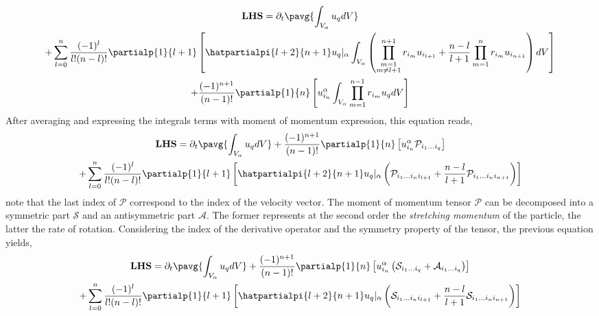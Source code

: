 {%
\begin{multline*}
    \textbf{LHS}
    = \partial_t \pavg{\int_{V_\alpha} u_q dV}\\
    + 
    \sum_{l=0}^n
    \frac{(-1)^l}{l!(n-l)!} \partialp{1}{l+1}
    \left[
    \hatpartialpi{l+2}{n+1} u_q|_\alpha
    \int_{V_\alpha} 
    \left(
        \prod_{\substack{m=1 \\ m \neq l+1}}^{n+1} r_{i_m}
        u_{i_{l+1}} 
        +\frac{n-l}{l+1}  
        \prod_{m=1}^{n}
        r_{i_m} u_{i_{n+1}}
    \right) dV
    \right]\\
    + \frac{(-1)^{n+1}}{(n-1)!} \partialp{1}{n}
    \left[
        u_{i_n}^\alpha \int_{V_\alpha}  
        \prod_{m=1}^{n-1} r_{i_m} u_q dV
    \right]
\end{multline*}
After averaging and expressing the integrals terms with moment of momentum expression, this equation reads,
\begin{multline*}
    \textbf{LHS}
    = \partial_t \pavg{\int_{V_\alpha} u_q dV}
    + \frac{(-1)^{n+1}}{(n-1)!} \partialp{1}{n}
    \left[
        u_{i_n}^\alpha   
        \mathcal{P}_{i_1 \ldots i_q}
    \right]\\
    + 
    \sum_{l=0}^n
    \frac{(-1)^l}{l!(n-l)!} \partialp{1}{l+1}
    \left[
    \hatpartialpi{l+2}{n+1} u_q|_\alpha
    \left(
        \mathcal{P}_{i_1 \ldots i_n i_{l+1}}
        +\frac{n-l}{l+1}  
        \mathcal{P}_{i_1 \ldots i_n i_{n+1}}
    \right) 
    \right]
\end{multline*}
note that the last index of $\mathcal{P}$ correspond to the index of the velocity vector.
The moment of momentum tensor $\mathcal{P}$ can be decomposed into a symmetric part $\mathcal{S}$ and an antisymmetric part $\mathcal{A}$.
The former represents at the second order the \textit{stretching momentum} of the particle, the latter the rate of rotation.
Considering the index of the derivative operator and the symmetry property of the tensor, the previous equation yields, 
\begin{multline*}
    \textbf{LHS}
    = \partial_t \pavg{\int_{V_\alpha} u_q dV}
    + \frac{(-1)^{n+1}}{(n-1)!} \partialp{1}{n}
    \left[
        u_{i_n}^\alpha   
        \left(
            \mathcal{S}_{i_1 \ldots i_q}
            +\mathcal{A}_{i_1 \ldots i_q}
        \right)
    \right]\\
    + 
    \sum_{l=0}^n
    \frac{(-1)^l}{l!(n-l)!} \partialp{1}{l+1}
    \left[
    \hatpartialpi{l+2}{n+1} u_q|_\alpha
    \left(
        \mathcal{S}_{i_1 \ldots i_n i_{l+1}}
        +\frac{n-l}{l+1}  
        \mathcal{S}_{i_1 \ldots i_n i_{n+1}}
    \right) 
    \right]
\end{multline*}

}
